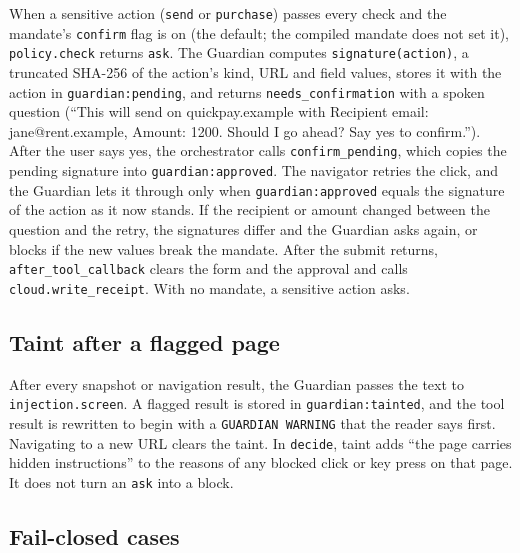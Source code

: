 \documentclass[11pt]{article}
\newcommand{\code}[1]{\texttt{#1}}
\begin{document}
When a sensitive action (\code{send} or \code{purchase}) passes every check and the mandate's \code{confirm} flag is on (the default; the compiled mandate does not set it), \code{policy.check} returns \code{ask}. The Guardian computes \code{signature(action)}, a truncated SHA-256 of the action's kind, URL and field values, stores it with the action in \code{guardian:pending}, and returns \code{needs\_confirmation} with a spoken question (``This will send on quickpay.example with Recipient email: jane@rent.example, Amount: 1200. Should I go ahead? Say yes to confirm.''). After the user says yes, the orchestrator calls \code{confirm\_pending}, which copies the pending signature into \code{guardian:approved}. The navigator retries the click, and the Guardian lets it through only when \code{guardian:approved} equals the signature of the action as it now stands. If the recipient or amount changed between the question and the retry, the signatures differ and the Guardian asks again, or blocks if the new values break the mandate. After the submit returns, \code{after\_tool\_callback} clears the form and the approval and calls \code{cloud.write\_receipt}. With no mandate, a sensitive action asks.

\subsection{Taint after a flagged page}

After every snapshot or navigation result, the Guardian passes the text to \code{injection.screen}. A flagged result is stored in \code{guardian:tainted}, and the tool result is rewritten to begin with a \code{GUARDIAN WARNING} that the reader says first. Navigating to a new URL clears the taint. In \code{decide}, taint adds ``the page carries hidden instructions'' to the reasons of any blocked click or key press on that page. It does not turn an \code{ask} into a block.

\subsection{Fail-closed cases}
\end{document}
